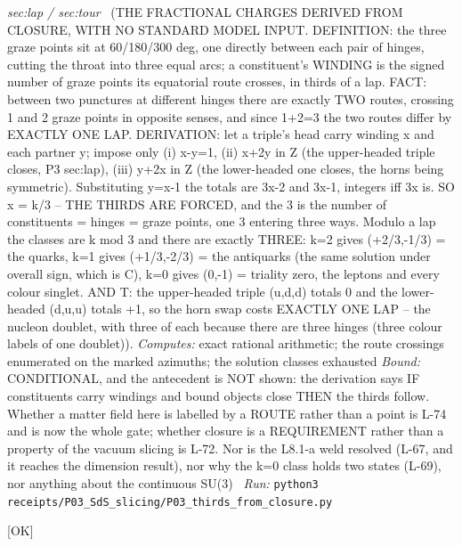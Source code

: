 \begin{description}
\textit{sec:lap / sec:tour} \ (THE FRACTIONAL CHARGES DERIVED FROM CLOSURE, WITH NO STANDARD MODEL INPUT. DEFINITION: the three graze points sit at 60/180/300 deg, one directly between each pair of hinges, cutting the throat into three equal arcs; a constituent's WINDING is the signed number of graze points its equatorial route crosses, in thirds of a lap. FACT: between two punctures at different hinges there are exactly TWO routes, crossing 1 and 2 graze points in opposite senses, and since 1+2=3 the two routes differ by EXACTLY ONE LAP. DERIVATION: let a triple's head carry winding x and each partner y; impose only (i) x-y=1, (ii) x+2y in Z (the upper-headed triple closes, P3 sec:lap), (iii) y+2x in Z (the lower-headed one closes, the horns being symmetric). Substituting y=x-1 the totals are 3x-2 and 3x-1, integers iff 3x is. SO x = k/3 -- THE THIRDS ARE FORCED, and the 3 is the number of constituents = hinges = graze points, one 3 entering three ways. Modulo a lap the classes are k mod 3 and there are exactly THREE: k=2 gives (+2/3,-1/3) = the quarks, k=1 gives (+1/3,-2/3) = the antiquarks (the same solution under overall sign, which is C), k=0 gives (0,-1) = triality zero, the leptons and every colour singlet. AND T: the upper-headed triple (u,d,d) totals 0 and the lower-headed (d,u,u) totals +1, so the horn swap costs EXACTLY ONE LAP -- the nucleon doublet, with three of each because there are three hinges (three colour labels of one doublet)). 
\emph{Computes:} exact rational arithmetic; the route crossings enumerated on the marked azimuths; the solution classes exhausted
 \emph{Bound:} CONDITIONAL, and the antecedent is NOT shown: the derivation says IF constituents carry windings and bound objects close THEN the thirds follow. Whether a matter field here is labelled by a ROUTE rather than a point is L-74 and is now the whole gate; whether closure is a REQUIREMENT rather than a property of the vacuum slicing is L-72. Nor is the L8.1-a weld resolved (L-67, and it reaches the dimension result), nor why the k=0 class holds two states (L-69), nor anything about the continuous SU(3)
\ \emph{Run:} \texttt{python3 receipts/P03\_SdS\_slicing/P03\_thirds\_from\_closure.py}
\item[\label{rcpt:P03_winding_and_closure}\texttt{P03\_winding\_and\_closure}]\hfill\textsf{[OK]}\\

\end{description}
